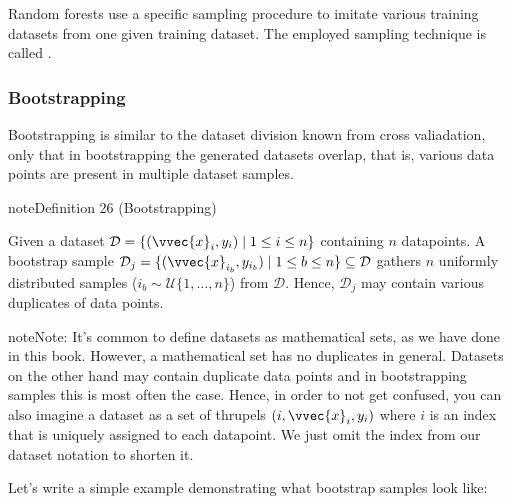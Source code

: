 \documentclass[letterpaper,10pt,english]{jupyterBook}
\begin{document}
\sphinxAtStartPar
Random forests use a specific sampling procedure to imitate various training datasets from one given training dataset. The employed sampling technique is called .


\subsubsection{Bootstrapping}
\label{\detokenize{classification_random_forests:bootstrapping}}
\sphinxAtStartPar
Bootstrapping is similar to the dataset division known from cross valiadation, only that in bootstrapping the generated datasets overlap, that is, various data points are present in multiple dataset samples.
\label{classification_random_forests:definition-3}
\begin{sphinxadmonition}{note}{Definition 26 (Bootstrapping)}



\sphinxAtStartPar
Given a dataset \(\mathcal{D}=\{(\vvec{x}_i,y_i)\mid 1\leq i\leq n\}\) containing \(n\) datapoints. A bootstrap sample \(\mathcal{D}_j=\{(\vvec{x}_{i_b},y_{i_b})\mid 1\leq b\leq n\}\subseteq\mathcal{D}\) gathers \(n\) uniformly distributed samples (\(i_b \sim\mathcal{U}\{1, \dots, n\}\)) from \(\mathcal{D}\). Hence, \(\mathcal{D}_j\) may contain various duplicates of data points.
\end{sphinxadmonition}

\begin{sphinxadmonition}{note}{Note:}
\sphinxAtStartPar
It’s common to define datasets as mathematical sets, as we have done in this book. However, a mathematical set has no duplicates in general. Datasets on the other hand may contain duplicate data points and in bootstrapping samples this is most often the case. Hence, in order to not get confused, you can also imagine a dataset as a set of thrupels \((i,\vvec{x}_i,y_i)\) where \(i\) is an index that is uniquely assigned to each datapoint. We just omit the index from our dataset notation to shorten it.
\end{sphinxadmonition}

\sphinxAtStartPar
Let’s write a simple example demonstrating what bootstrap samples look like:
\end{document}
